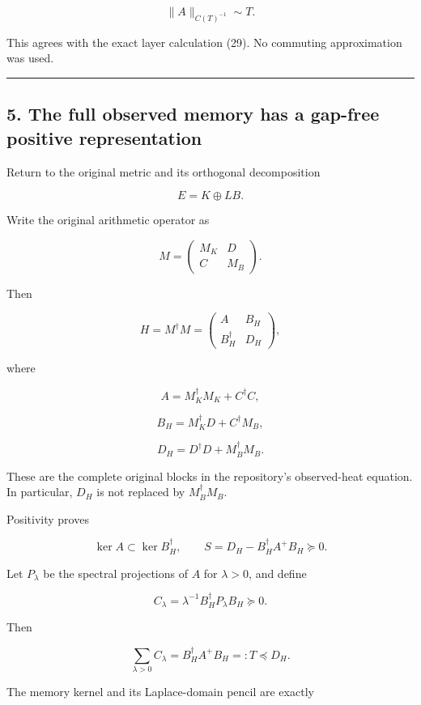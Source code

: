 \documentclass[11pt]{article}
\begin{document}
\[
\|A\|_{C(T)^{-1}}\sim T.
\]

This agrees with the exact layer calculation (29). No commuting approximation was used.

\begin{center}\rule{0.5\linewidth}{0.5pt}\end{center}

\subsection{5. The full observed memory has a gap-free positive representation}\label{the-full-observed-memory-has-a-gap-free-positive-representation}

Return to the original metric and its orthogonal decomposition

\[
E=K\oplus L B.
\]

Write the original arithmetic operator as

\[
M=
\begin{pmatrix}
M_K&D\\
C&M_B
\end{pmatrix}.
\]

Then

\[
H=M^\dagger M
=
\begin{pmatrix}
A&B_H\\
B_H^\dagger&D_H
\end{pmatrix},
\]

where

\[
A=M_K^\dagger M_K+C^\dagger C,
\]

\[
B_H=M_K^\dagger D+C^\dagger M_B,
\]

\[
D_H=D^\dagger D+M_B^\dagger M_B.
\tag{33}
\]

These are the complete original blocks in the repository's observed-heat equation. In particular, \(D_H\) is not replaced by \(M_B^\dagger M_B\).

Positivity proves

\[
\ker A\subset\ker B_H^\dagger,
\qquad
S=D_H-B_H^\dagger A^+B_H\succeq0.
\]

Let \(P_\lambda\) be the spectral projections of \(A\) for \(\lambda>0\), and define

\[
C_\lambda=\lambda^{-1}B_H^\dagger P_\lambda B_H\succeq0.
\]

Then

\[
\sum_{\lambda>0}C_\lambda
=B_H^\dagger A^+B_H
=:T\preceq D_H.
\tag{34}
\]

The memory kernel and its Laplace-domain pencil are exactly
\end{document}
